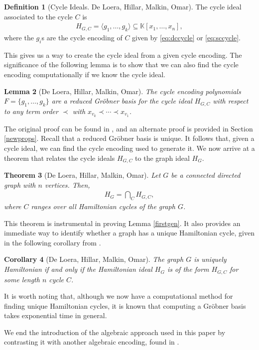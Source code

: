 \documentclass{amsart}
\renewcommand{\(}{\left(}
\renewcommand{\)}{\right)}
\newcommand{\<}{\langle}
\renewcommand{\>}{\rangle}
\renewcommand{\k}{\mathbb K}
\newcommand{\aln}[1]{\begin{align*} #1 \end{align*}} %
\newtheorem{theorem}{Theorem}[section]
\newtheorem{lemma}[theorem]{Lemma}
\newtheorem{corollary}[theorem]{Corollary}
\theoremstyle{definition}
\newtheorem{definition}[theorem]{Definition}
\theoremstyle{remark}
\begin{document}
\begin{definition}[Cycle Ideals. De Loera, Hillar, Malkin, Omar]
	The cycle ideal associated to the cycle $C$ is \aln{H_{G,C} = \<g_1,\ldots,g_k\> \subseteq \k[x_1,\ldots,x_n],}where the $g_i$s are the cycle encoding of $C$ given by \eqref{eq:dccycle} or \eqref{eq:sccycle}.
\end{definition}

This gives us a way to create the cycle ideal from a given cycle encoding. The significance of the following lemma is to show that we can also find the cycle encoding computationally if we know the cycle ideal.

\begin{lemma}[De Loera, Hillar, Malkin, Omar] \label{lemma33}
	The cycle encoding polynomials $F = \{g_1,\ldots,g_k\}$ are a reduced Gr\"obner basis for the cycle ideal $H_{G,C}$ with respect to any term order $\prec$ with $x_{v_k} \prec \cdots \prec x_{v_1}$.
\end{lemma}

The original proof can be found in \cite{deloera10}, and an alternate proof is provided in Section \ref{newprops}. Recall that a reduced Gr\"obner basis is unique. It follows that, given a cycle ideal, we can find the cycle encoding used to generate it. We now arrive at a theorem that relates the cycle ideals $H_{G,C}$ to the graph ideal $H_G$.

\begin{theorem}[De Loera, Hillar, Malkin, Omar] \label{intersection}
	Let $G$ be a connected directed graph with $n$ vertices. Then,
	\aln{
		H_G = \bigcap_C H_{G,C},
	}
	where $C$ ranges over all Hamiltonian cycles of the graph $G$.
\end{theorem}
This theorem is instrumental in proving Lemma \ref{firstgen}. It also provides an immediate way to identify whether a graph has a unique Hamiltonian cycle, given in the following corollary from \cite{deloera10}.

\begin{corollary}[De Loera, Hillar, Malkin, Omar]
	The graph $G$ is uniquely Hamiltonian if and only if the Hamiltonian ideal $H_G$ is of the form $H_{G,C}$ for some length $n$ cycle $C$.
\end{corollary}

It is worth noting that, although we now have a computational method for finding unique Hamiltonian cycles, it is known that computing a Gr\"obner basis takes exponential time in general.

We end the introduction of the algebraic approach used in this paper by contrasting it with another algebraic encoding, found in \cite{deloera07}.
\end{document}
